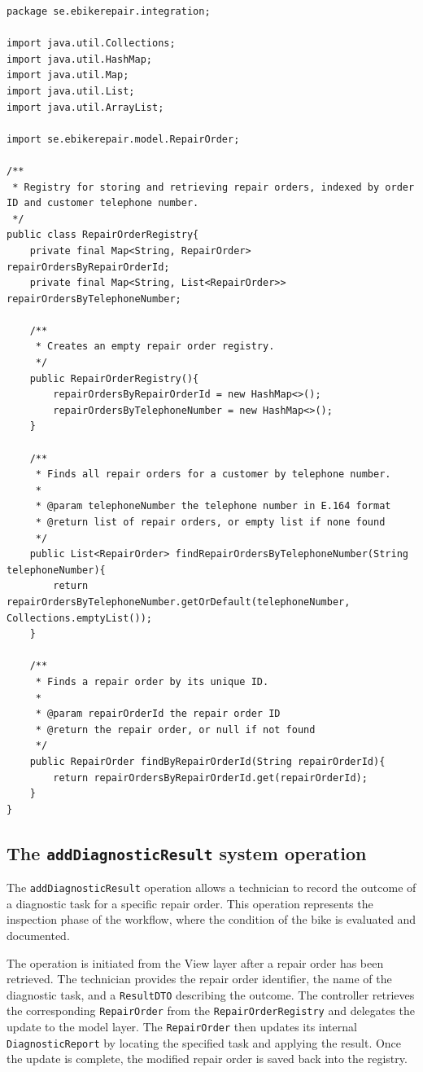 \documentclass[a4paper]{scrartcl}
\begin{document}
\begin{lstlisting}[style=javastyle, caption={Main class entry point}]
package se.ebikerepair.integration;

import java.util.Collections;
import java.util.HashMap;
import java.util.Map;
import java.util.List;
import java.util.ArrayList;

import se.ebikerepair.model.RepairOrder;

/**
 * Registry for storing and retrieving repair orders, indexed by order ID and customer telephone number.
 */
public class RepairOrderRegistry{
    private final Map<String, RepairOrder> repairOrdersByRepairOrderId;
    private final Map<String, List<RepairOrder>> repairOrdersByTelephoneNumber;

    /**
     * Creates an empty repair order registry.
     */
    public RepairOrderRegistry(){
        repairOrdersByRepairOrderId = new HashMap<>();
        repairOrdersByTelephoneNumber = new HashMap<>();
    }

    /**
     * Finds all repair orders for a customer by telephone number.
     *
     * @param telephoneNumber the telephone number in E.164 format
     * @return list of repair orders, or empty list if none found
     */
    public List<RepairOrder> findRepairOrdersByTelephoneNumber(String telephoneNumber){
        return repairOrdersByTelephoneNumber.getOrDefault(telephoneNumber, Collections.emptyList());
    }

    /**
     * Finds a repair order by its unique ID.
     *
     * @param repairOrderId the repair order ID
     * @return the repair order, or null if not found
     */
    public RepairOrder findByRepairOrderId(String repairOrderId){
        return repairOrdersByRepairOrderId.get(repairOrderId);
    }
}

\end{lstlisting}

\subsection{The \texttt{addDiagnosticResult} system operation}

The \texttt{addDiagnosticResult} operation allows a technician to record the outcome of a diagnostic task for a specific repair order. This operation represents the inspection phase of the workflow, where the condition of the bike is evaluated and documented.

The operation is initiated from the View layer after a repair order has been retrieved. The technician provides the repair order identifier, the name of the diagnostic task, and a \texttt{ResultDTO} describing the outcome. The controller retrieves the corresponding \texttt{RepairOrder} from the \texttt{RepairOrderRegistry} and delegates the update to the model layer. The \texttt{RepairOrder} then updates its internal \texttt{DiagnosticReport} by locating the specified task and applying the result. Once the update is complete, the modified repair order is saved back into the registry.
\end{document}
